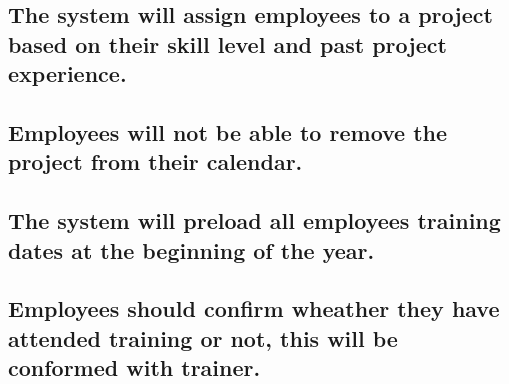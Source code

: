 \documentclass{article}
\begin{document}
	\subsection{The system will assign employees to a project based
		on their skill level and past project experience. }
	
	\subsection{Employees will not be able to remove the project
		from their calendar. }
	
	\subsection{The system will preload all employees training dates
		at the beginning of the year. }
	
	\subsection{Employees should confirm wheather they have attended training or not, this will be conformed with trainer. }
	
\end{document}
